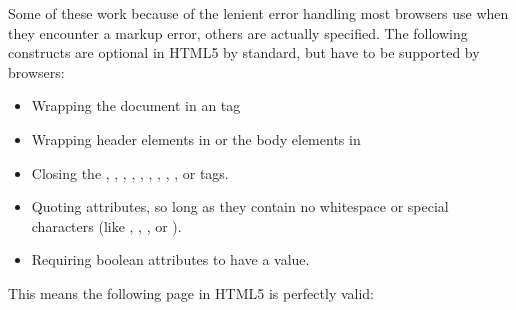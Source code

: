 \documentclass[a4paper,12pt]{sphinxmanual}
\begin{document}
Some of these work because of the lenient error handling most browsers use
when they encounter a markup error, others are actually specified.  The
following constructs are optional in HTML5 by standard, but have to be
supported by browsers:
\begin{itemize}
\item {} 
Wrapping the document in an  tag

\item {} 
Wrapping header elements in  or the body elements in

\item {} 
Closing the , , , , ,
, , , , or  tags.

\item {} 
Quoting attributes, so long as they contain no whitespace or
special characters (like \code{\textless{}}, \code{\textgreater{}}, , or ).

\item {} 
Requiring boolean attributes to have a value.

\end{itemize}

This means the following page in HTML5 is perfectly valid:
\end{document}
